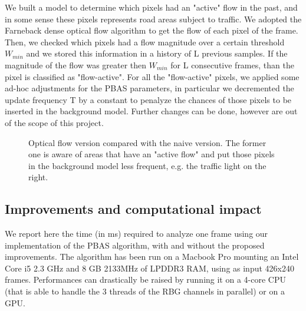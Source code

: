We built a model to determine which pixels had an "active" flow in the past, and in some sense these pixels represents road areas subject to traffic. We adopted the Farneback dense optical flow algorithm to get the flow of each pixel of the frame. Then, we checked which pixels had a flow magnitude over a certain threshold $W_{min}$ and we stored this information in a history of L previous samples. If the magnitude of the flow was greater then $W_{min}$ for L consecutive frames, than the pixel is classified as "flow-active". For all the "flow-active" pixels, we applied some ad-hoc adjustments for the PBAS parameters, in particular we decremented the update frequency T by a constant to penalyze the chances of those pixels to be inserted in the background model. Further changes can be done, however are out of the scope of this project.

\begin{figure}[!t]
    \centering
    \newline
	\caption{Optical flow version compared with the naive version. The former one is aware of areas that have an "active flow" and put those pixels in the background model less frequent, e.g. the traffic light on the right.}
\end{figure}

\subsection*{Improvements and computational impact}
We report here the time (in ms) required to analyze one frame using our implementation of the PBAS algorithm, with and without the proposed improvements. The algorithm has been run on a Macbook Pro mounting an Intel Core i5 2.3 GHz and 8 GB 2133MHz of LPDDR3 RAM, using as input 426x240 frames. Performances can drastically be raised by running it on a 4-core CPU (that is able to handle the 3 threads of the RBG channels in parallel) or on a GPU.

